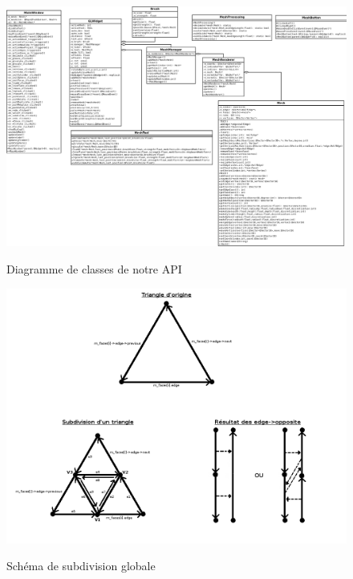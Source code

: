 \documentclass[a4paper]{memoir}
\begin{document}
			\begin{figure}
					\hspace{-2,75cm}\includegraphics{img/diagClass.png}
				\label{fig:diagClass}
				\caption{Diagramme de classes de notre API}
			\end{figure}
			
			\begin{figure}
				\hspace{-3cm}\includegraphics[scale=0.5]{img/subdivide.png}
				\label{fig:subdivide}
				\caption{Schéma de subdivision globale}
			\end{figure}
\end{document}
